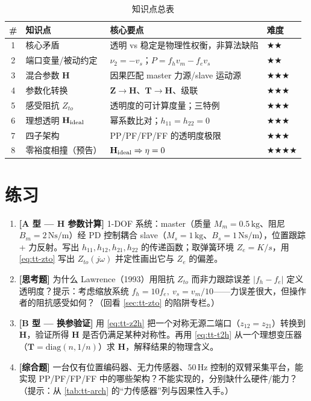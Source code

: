 \begin{table}[H]\centering\small
\caption{知识点总表}
\label{tab:tt-knowledge}
\begin{tabular}{clll}
\toprule
\# & 知识点 & 核心要点 & 难度 \\
\midrule
1 & 核心矛盾 & 透明 vs 稳定是物理性权衡，非算法缺陷 & \(\bigstar\bigstar\) \\
2 & 端口变量/被动约定 & $\nu_2=-v_s$；$P=f_hv_m-f_ev_s$ & \(\bigstar\bigstar\) \\
3 & 混合参数 $\mathbf H$ & 因果匹配 master 力源/slave 运动源 & \(\bigstar\bigstar\bigstar\) \\
4 & 参数化转换 & $\mathbf Z\to\mathbf H$、$\mathbf T\to\mathbf H$、级联 & \(\bigstar\bigstar\bigstar\) \\
5 & 感受阻抗 $Z_{to}$ & 透明度的可计算度量；三特例 & \(\bigstar\bigstar\bigstar\) \\
6 & 理想透明 $\mathbf H_{\rm ideal}$ & 幂系数比对；$h_{11}=h_{22}=0$ & \(\bigstar\bigstar\bigstar\) \\
7 & 四子架构 & PP/PF/FP/FF 的透明度极限 & \(\bigstar\bigstar\bigstar\) \\
8 & 零裕度相撞（预告） & $\mathbf H_{\rm ideal}\Rightarrow\eta=0$ & \(\bigstar\bigstar\bigstar\bigstar\) \\
\bottomrule
\end{tabular}
\end{table}

\section*{练习}
\begin{practice}[练习]
\begin{enumerate}
  \item \textbf{[A 型 — $\mathbf H$ 参数计算]} 1-DOF 系统：master（质量 $M_m=0.5\,\mathrm{kg}$、阻尼 $B_m=2\,\mathrm{Ns/m}$）经 PD 控制耦合 slave（$M_s=1\,\mathrm{kg}$、$B_s=1\,\mathrm{Ns/m}$），位置跟踪 + 力反射。写出 $h_{11},h_{12},h_{21},h_{22}$ 的传递函数；取弹簧环境 $Z_e=K/s$，用 \cref{eq:tt-zto} 写出 $Z_{to}(j\omega)$ 并定性画出它与 $Z_e$ 的偏差。
  \item \textbf{[思考题]} 为什么 Lawrence（1993）用阻抗 $Z_{to}$ 而非力跟踪误差 $|f_h-f_e|$ 定义透明度？提示：考虑缩放系统 $f_h=10f_e,\ v_s=v_m/10$——力误差很大，但操作者的阻抗感受如何？（回看 \cref{sec:tt-zto} 的陷阱专栏。）
  \item \textbf{[B 型 — 换参验证]} 用 \cref{eq:tt-z2h} 把一个对称无源二端口（$z_{12}=z_{21}$）转换到 $\mathbf H$，验证所得 $\mathbf H$ 是否仍满足某种对称性。再用 \cref{eq:tt-t2h} 从一个理想变压器（$\mathbf T=\mathrm{diag}(n,1/n)$）求 $\mathbf H$，解释结果的物理含义。
  \item \textbf{[综合题]} 一台仅有位置编码器、无力传感器、$50\,\mathrm{Hz}$ 控制的双臂采集平台，能实现 PP/PF/FP/FF 中的哪些架构？不能实现的，分别缺什么硬件/能力？（提示：从 \cref{tab:tt-arch} 的“力传感器”列与因果性入手。）
\end{enumerate}
\end{practice}

